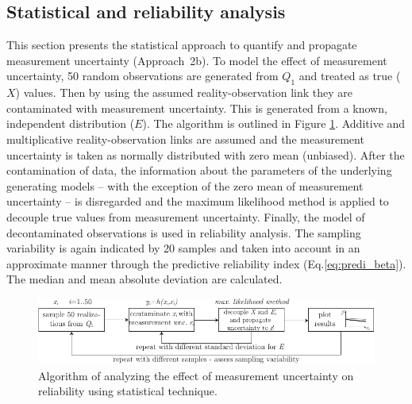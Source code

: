 \subsection{Statistical and reliability analysis}
This section presents the statistical approach to quantify and propagate measurement uncertainty (Approach~2b). To model the effect of measurement uncertainty, 50 random observations are generated from $Q_1$ and treated as true ($X$) values. Then by using the assumed reality-observation link they are contaminated with measurement uncertainty. This is generated from a known, independent distribution ($E$). The algorithm is outlined in Figure \ref{fig:stat_alg}. Additive and multiplicative reality-observation links are assumed and the measurement uncertainty is taken as normally distributed with zero mean (unbiased). After the contamination of data, the information about the parameters of the underlying generating models -- with the exception of the zero mean of measurement uncertainty -- is disregarded and the maximum likelihood method is applied to decouple true values from measurement uncertainty. Finally, the model of decontaminated observations is used in reliability analysis. The sampling variability is again indicated by 20 samples and taken into account in an approximate manner through the predictive reliability index (Eq.\ref{eq:predi_beta}). The median and mean absolute deviation are calculated.
\begin{figure}[htbp!] 
	\centering    
	\includegraphics[]{statistical_analysis_algorithm_.pdf}
	\caption{Algorithm of analyzing the effect of measurement uncertainty on reliability using statistical technique.}
	\label{fig:stat_alg}
\end{figure}

